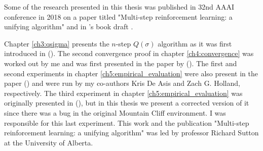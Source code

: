 \providecommand{\main}{..}



\begin{preface}
Some of the research presented in this thesis was published in 32nd AAAI conference in 2018 on a paper titled "Multi-step reinforcement learning: a unifying algorithm" \parencite{qsigma-paper} and in \citeauthor{sutton2018}'s book draft \parencite{sutton2018}.

Chapter \ref{ch3:qsigma} presents the $n$-step $Q(\sigma)$ algorithm as it was first introduced in \citeauthor{sutton2018} (\citeyear{sutton2018}).
The second convergence proof in chapter \ref{ch4:convergence} was worked out by me and was first presented in the paper by \citeauthor{qsigma-paper} (\citeyear{qsigma-paper}).
The first and second experiments in chapter \ref{ch5:empirical_evaluation} were also present in the paper \citeauthor{qsigma-paper} (\citeyear{qsigma-paper}) and were run by my co-authors Kris De Asis and Zach G. Holland, respectively. 
The third experiment in chapter \ref{ch5:empirical_evaluation} was originally presented in \citeauthor{qsigma-paper} (\citeyear{qsigma-paper}), but in this thesis we present a corrected version of it since there was a bug in the original Mountain Cliff environment.
I was responsible for this last experiment. 
This work and the publication "Multi-step reinforcement learning: a unifying algorithm" was led by professor Richard Sutton at the University of Alberta.

\end{preface}

